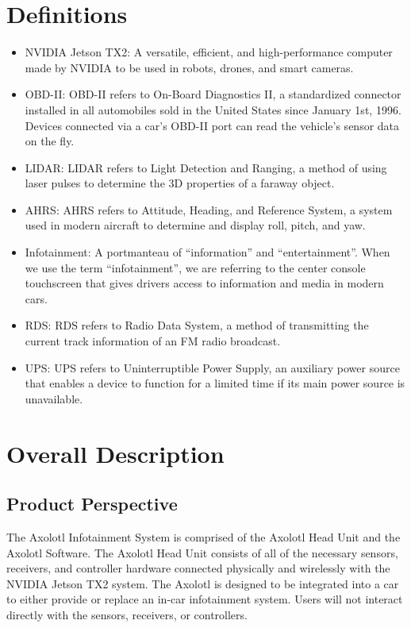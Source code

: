 \documentclass[onecolumn, draftclsnofoot,10pt, compsoc]{IEEEtran}
\begin{document}
\section{Definitions}
\begin{itemize}
	\item NVIDIA Jetson TX2: A versatile, efficient, and high-performance computer made by NVIDIA to be used in robots, drones, and smart cameras.

	\item OBD-II: OBD-II refers to On-Board Diagnostics II, a standardized connector installed in all automobiles sold in the United States since January 1st, 1996. Devices connected via a car's OBD-II port can read the vehicle's sensor data on the fly.

	\item LIDAR: LIDAR refers to Light Detection and Ranging, a method of using laser pulses to determine the 3D properties of a faraway object.

	\item AHRS: AHRS refers to Attitude, Heading, and Reference System, a system used in modern aircraft to determine and display roll, pitch, and yaw.

	\item Infotainment: A portmanteau of “information” and “entertainment”. When we use the term “infotainment”, we are referring to the center console touchscreen that gives drivers access to information and media in modern cars.

	\item RDS: RDS refers to Radio Data System, a method of transmitting the current track information of an FM radio broadcast.

	\item UPS: UPS refers to Uninterruptible Power Supply, an auxiliary power source that enables a device to function for a limited time if its main power source is unavailable.

\end{itemize}

\section{Overall Description}
\subsection{Product Perspective}
The Axolotl Infotainment System is comprised of the Axolotl Head Unit and the Axolotl Software.
The Axolotl Head Unit consists of all of the necessary sensors, receivers, and controller hardware connected physically and wirelessly with the NVIDIA Jetson TX2 system. The Axolotl is designed to be integrated into a car to either provide or replace an in-car infotainment system. Users will not interact directly with the sensors, receivers, or controllers.\par
\end{document}
